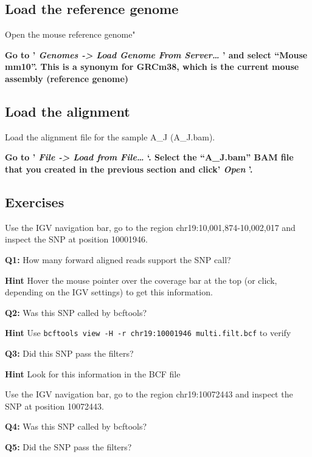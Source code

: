 \documentclass[11pt]{article}
\begin{document}
    \hypertarget{load-the-reference-genome}{%
\subsection{Load the reference genome}\label{load-the-reference-genome}}

Open the mouse reference genome"

\textbf{Go to ' \textit{Genomes -\textgreater{} Load Genome From
Server\ldots{}} ' and select ``Mouse mm10''. This is a synonym for
GRCm38, which is the current mouse assembly (reference genome)}

    \hypertarget{load-the-alignment}{%
\subsection{Load the alignment}\label{load-the-alignment}}

Load the alignment file for the sample A\_J (A\_J.bam).

\textbf{Go to ' \textit{File -\textgreater{} Load from File\ldots{}} `.
Select the ``A\_J.bam'' BAM file that you created in the previous
section and click' \textit{Open} '.}

    \hypertarget{exercises}{%
\subsection{Exercises}\label{exercises}}

Use the IGV navigation bar, go to the region chr19:10,001,874-10,002,017
and inspect the SNP at position 10001946.

\textbf{Q1:} How many forward aligned reads support the SNP call?

\textbf{Hint} Hover the mouse pointer over the coverage bar at the top
(or click, depending on the IGV settings) to get this information.

\textbf{Q2:} Was this SNP called by bcftools?

\textbf{Hint} Use
\texttt{bcftools\ view\ -H\ -r\ chr19:10001946\ multi.filt.bcf} to
verify

\textbf{Q3:} Did this SNP pass the filters?

\textbf{Hint} Look for this information in the BCF file

Use the IGV navigation bar, go to the region chr19:10072443 and inspect
the SNP at position 10072443.

\textbf{Q4:} Was this SNP called by bcftools?

\textbf{Q5:} Did the SNP pass the filters?
\end{document}
